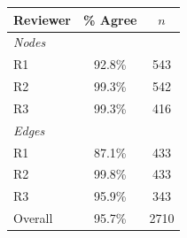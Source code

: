 \begin{tabular}{l c c}
\toprule
Reviewer & \% Agree & $n$ \\
\midrule
\multicolumn{3}{l}{\textit{Nodes}} \\
\midrule
  R1 & 92.8\% & 543 \\
  R2 & 99.3\% & 542 \\
  R3 & 99.3\% & 416 \\
\midrule
\multicolumn{3}{l}{\textit{Edges}} \\
\midrule
  R1 & 87.1\% & 433 \\
  R2 & 99.8\% & 433 \\
  R3 & 95.9\% & 343 \\
\midrule
Overall & 95.7\% & 2710 \\
\bottomrule
\end{tabular}
